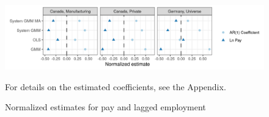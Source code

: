 





\begin{figure} [H]
\centering
\includegraphics[width=\linewidth]{r-graphs/fig_estimates3.png}
\caption{Normalized estimates for pay and lagged employment\label{fig:estimates3}} 
\begin{minipage}{0.48\linewidth}
{\footnotesize For details on the estimated coefficients, see the Appendix. \par}
\end{minipage}
\end{figure}

\clearpage
